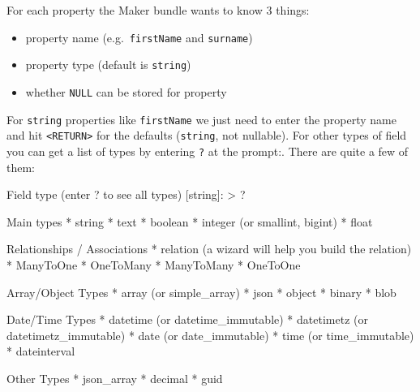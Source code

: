 \documentclass[a4paperpaper,openright]{book}
\newenvironment{Shaded}{}{}
\newcommand{\ExtensionTok}[1]{#1}
\newcommand{\NormalTok}[1]{#1}
\newcommand{\OperatorTok}[1]{\textcolor[rgb]{0.40,0.40,0.40}{#1}}
\providecommand{\tightlist}{%
  \setlength{\itemsep}{0pt}\setlength{\parskip}{0pt}}
\begin{document}
For each property the Maker bundle wants to know 3 things:

\begin{itemize}
\tightlist
\item
  property name (e.g.~\texttt{firstName} and \texttt{surname})
\item
  property type (default is \texttt{string})
\item
  whether \texttt{NULL} can be stored for property
\end{itemize}

For \texttt{string} properties like \texttt{firstName} we just need to
enter the property name and hit \texttt{\textless{}RETURN\textgreater{}}
for the defaults (\texttt{string}, not nullable). For other types of
field you can get a list of types by entering \texttt{?} at the prompt:.
There are quite a few of them:

\begin{Shaded}
\begin{Highlighting}[]
     \ExtensionTok{Field}\NormalTok{ type (enter ? to see all types) [}\ExtensionTok{string}\NormalTok{]:}
     \OperatorTok{>} \ExtensionTok{?}
    
    \ExtensionTok{Main}\NormalTok{ types}
      \ExtensionTok{*}\NormalTok{ string}
      \ExtensionTok{*}\NormalTok{ text}
      \ExtensionTok{*}\NormalTok{ boolean}
      \ExtensionTok{*}\NormalTok{ integer (or smallint, bigint)}
      \ExtensionTok{*}\NormalTok{ float}
    
    \ExtensionTok{Relationships}\NormalTok{ / Associations}
      \ExtensionTok{*}\NormalTok{ relation (a wizard   will help you build the relation)}
      \ExtensionTok{*}\NormalTok{ ManyToOne}
      \ExtensionTok{*}\NormalTok{ OneToMany}
      \ExtensionTok{*}\NormalTok{ ManyToMany}
      \ExtensionTok{*}\NormalTok{ OneToOne}
    
    \ExtensionTok{Array/Object}\NormalTok{ Types}
      \ExtensionTok{*}\NormalTok{ array (or simple_array)}
      \ExtensionTok{*}\NormalTok{ json}
      \ExtensionTok{*}\NormalTok{ object}
      \ExtensionTok{*}\NormalTok{ binary}
      \ExtensionTok{*}\NormalTok{ blob}
    
    \ExtensionTok{Date/Time}\NormalTok{ Types}
      \ExtensionTok{*}\NormalTok{ datetime (or datetime_immutable)}
      \ExtensionTok{*}\NormalTok{ datetimetz (or datetimetz_immutable)}
      \ExtensionTok{*}\NormalTok{ date (or date_immutable)}
      \ExtensionTok{*}\NormalTok{ time (or time_immutable)}
      \ExtensionTok{*}\NormalTok{ dateinterval}
    
    \ExtensionTok{Other}\NormalTok{ Types}
      \ExtensionTok{*}\NormalTok{ json_array}
      \ExtensionTok{*}\NormalTok{ decimal}
      \ExtensionTok{*}\NormalTok{ guid}
\end{Highlighting}
\end{Shaded}
\end{document}
